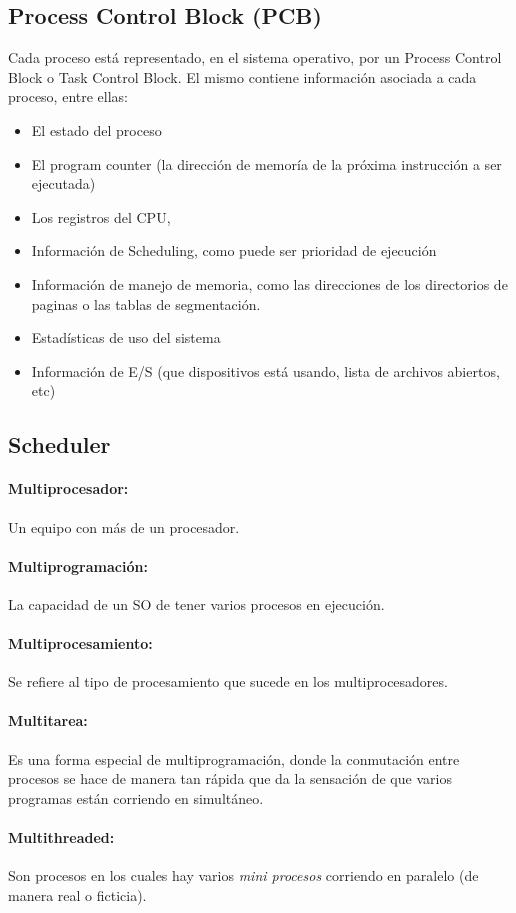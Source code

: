 \subsection{Process Control Block (PCB)}\label{process::pcb}
Cada proceso está representado, en el sistema operativo, por un Process Control Block o Task Control Block. El mismo contiene información asociada a cada proceso, entre ellas:
\begin{itemize}
	\item El estado del proceso
	\item El program counter (la dirección de memoría de la próxima instrucción a ser ejecutada)
	\item Los registros del CPU,
	\item Información de Scheduling, como puede ser prioridad de ejecución
	\item Información de manejo de memoria, como las direcciones de los directorios de paginas o las tablas de segmentación.
	\item Estadísticas de uso del sistema
	\item Información de E/S (que dispositivos está usando, lista de archivos abiertos, etc)
\end{itemize}

\subsection{Scheduler}
\paragraph{Multiprocesador:} Un equipo con más de un procesador.
\paragraph{Multiprogramación:} La capacidad de un SO de tener varios procesos en ejecución.
\paragraph{Multiprocesamiento:} Se refiere al tipo de procesamiento que sucede en los multiprocesadores.
\paragraph{Multitarea:} Es una forma especial de multiprogramación, donde la conmutación entre procesos se hace de manera tan rápida que da la sensación de que varios programas están corriendo en simultáneo.
\paragraph{Multithreaded:} Son procesos en los cuales hay varios \textit{mini procesos} corriendo en paralelo (de manera real o ficticia).

